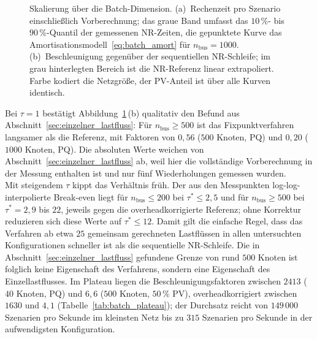 \begin{figure}[htbp]
	\centering
	
	\caption{Skalierung über die Batch-Dimension. (a)~Rechenzeit pro Szenario
		einschließlich Vorberechnung; das graue Band umfasst das $10\,\%$- bis
		$90\,\%$-Quantil der gemessenen NR-Zeiten, die gepunktete Kurve das
		Amortisationsmodell~\eqref{eq:batch_amort} für $n_\mathrm{bus}=1000$.
		(b)~Beschleunigung gegenüber der sequentiellen NR-Schleife; im grau
		hinterlegten Bereich ist die NR-Referenz linear extrapoliert. Farbe
		kodiert die Netzgröße, der PV-Anteil ist über alle Kurven identisch.}
	\label{fig:batch_scaling_tau}
\end{figure}





Bei $\tau=1$ bestätigt Abbildung~\ref{fig:batch_scaling_tau}\,(b)
qualitativ den Befund aus Abschnitt~\ref{sec:einzelner_lastfluss}: Für
$n_\mathrm{bus}\ge500$ ist das Fixpunktverfahren langsamer als die Referenz,
mit Faktoren von $0{,}56$ ($500$ Knoten, PQ) und $0{,}20$ ($1000$ Knoten,
PQ). Die absoluten Werte weichen von Abschnitt~\ref{sec:einzelner_lastfluss}
ab, weil hier die vollständige Vorberechnung in der Messung enthalten ist und
nur fünf Wiederholungen gemessen wurden.\\

Mit steigendem $\tau$ kippt das Verhältnis früh. Der aus den Messpunkten
log-log-interpolierte Break-even liegt für $n_\mathrm{bus}\le200$ bei
$\tau^\ast\le2{,}5$ und für $n_\mathrm{bus}\ge500$ bei $\tau^\ast=2{,}9$ bis
$22$, jeweils gegen die overheadkorrigierte Referenz; ohne Korrektur
reduzieren sich diese Werte auf $\tau^\ast\le12$. Damit gilt die einfache
Regel, dass das Verfahren ab etwa $25$ gemeinsam gerechneten Lastflüssen in
allen untersuchten Konfigurationen schneller ist als die sequentielle
NR-Schleife. Die in Abschnitt~\ref{sec:einzelner_lastfluss} gefundene Grenze
von rund $500$ Knoten ist folglich keine Eigenschaft des Verfahrens, sondern
eine Eigenschaft des Einzellastflusses. Im Plateau liegen die
Beschleunigungsfaktoren zwischen $2413$ ($40$ Knoten, PQ) und $6{,}6$ ($500$
Knoten, $50\,\%$ PV), overheadkorrigiert zwischen $1630$ und $4{,}1$
(Tabelle~\ref{tab:batch_plateau}); der Durchsatz reicht von $149\,000$
Szenarien pro Sekunde im kleinsten Netz bis zu $315$ Szenarien pro Sekunde in
der aufwendigsten Konfiguration.

